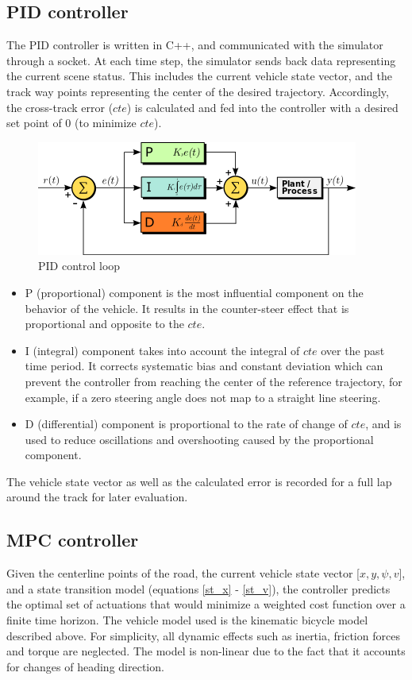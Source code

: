       \subsection{PID controller}
      The PID controller is written in C++, and communicated with the simulator through a socket. At each time step, the simulator sends back data representing the current scene status. This includes the current vehicle state vector, and the track way points representing the center of the desired trajectory. Accordingly, the cross-track error (\(cte\)) is calculated and fed into the controller with a desired set point of \(0\) (to minimize \(cte\)).
\begin{figure}[htbp]
\centerline{\includegraphics[width=\linewidth]{Figures/PID.png}}
\caption{PID control loop}
\end{figure}
\begin{itemize}
\item P (proportional) component is the most influential component on the behavior of the vehicle. It results in the counter-steer effect that is proportional and opposite to the \(cte\).
\item I (integral) component takes into account the integral of \(cte\) over the past time period. It corrects systematic bias and constant deviation which can prevent the controller from reaching the center of the reference trajectory, for example, if a zero steering angle does not map to a straight line steering.
\item D (differential) component is proportional to the rate of change of \(cte\), and is used to reduce oscillations and overshooting caused by the proportional component.
\end{itemize}
The vehicle state vector as well as the calculated error is recorded for a full lap around the track for later evaluation.

      \subsection{MPC controller}
      Given the centerline points of the road, the current vehicle state vector [\(x, y, \psi, v\)], and a state transition model (equations \eqref{st_x} - \eqref{st_v}), the controller predicts the optimal set of actuations that would minimize a weighted cost function over a finite time horizon. The vehicle model used is the kinematic bicycle model described above. For simplicity, all dynamic effects such as inertia, friction forces and torque are neglected. The model is non-linear due to the fact that it accounts for changes of heading direction.

